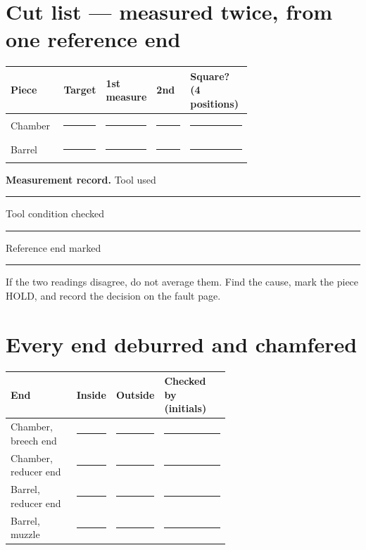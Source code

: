 \section{Cut list --- measured twice, from one reference end}
\begin{tabularx}{\linewidth}{@{}p{0.22\linewidth}p{0.16\linewidth}p{0.16\linewidth}p{0.14\linewidth}L@{}}
\toprule
\textbf{Piece} & \textbf{Target} & \textbf{1st measure} & \textbf{2nd} & \textbf{Square? (4 positions)}\\
\midrule
Chamber & \rule{0.8\linewidth}{0.4pt} & \rule{0.8\linewidth}{0.4pt} & \rule{0.8\linewidth}{0.4pt} & \rule{0.7\linewidth}{0.4pt}\\[0.55em]
Barrel & \rule{0.8\linewidth}{0.4pt} & \rule{0.8\linewidth}{0.4pt} & \rule{0.8\linewidth}{0.4pt} & \rule{0.7\linewidth}{0.4pt}\\
\bottomrule
\end{tabularx}

\begin{telosframe}
\textbf{Measurement record.} Tool used \rule{0.24\linewidth}{0.4pt}\quad
Tool condition checked \rule{0.20\linewidth}{0.4pt}\quad
Reference end marked \rule{0.16\linewidth}{0.4pt}\par
\smallskip
If the two readings disagree, do not average them. Find the cause, mark the
piece HOLD, and record the decision on the fault page.
\end{telosframe}

\section{Every end deburred and chamfered}
\begin{tabularx}{\linewidth}{@{}p{0.30\linewidth}p{0.16\linewidth}p{0.16\linewidth}L@{}}
\toprule
\textbf{End} & \textbf{Inside} & \textbf{Outside} & \textbf{Checked by (initials)}\\
\midrule
Chamber, breech end & \rule{0.7\linewidth}{0.4pt} & \rule{0.7\linewidth}{0.4pt} & \rule{0.8\linewidth}{0.4pt}\\[0.5em]
Chamber, reducer end & \rule{0.7\linewidth}{0.4pt} & \rule{0.7\linewidth}{0.4pt} & \rule{0.8\linewidth}{0.4pt}\\[0.5em]
Barrel, reducer end & \rule{0.7\linewidth}{0.4pt} & \rule{0.7\linewidth}{0.4pt} & \rule{0.8\linewidth}{0.4pt}\\[0.5em]
Barrel, muzzle & \rule{0.7\linewidth}{0.4pt} & \rule{0.7\linewidth}{0.4pt} & \rule{0.8\linewidth}{0.4pt}\\
\bottomrule
\end{tabularx}

